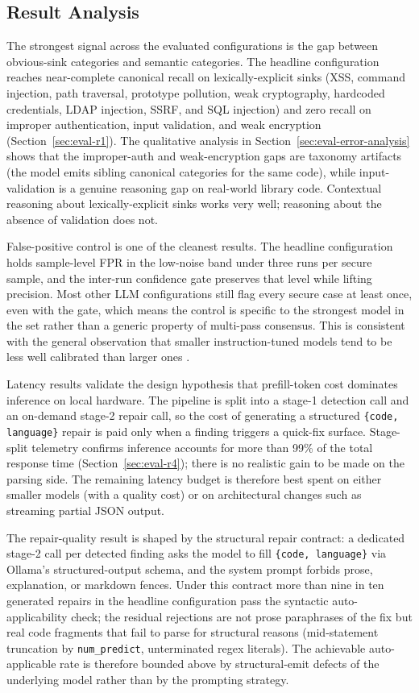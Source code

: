 \subsection{Result Analysis}

The strongest signal across the evaluated configurations is the gap between obvious-sink categories and semantic categories. The headline configuration reaches near-complete canonical recall on lexically-explicit sinks (XSS, command injection, path traversal, prototype pollution, weak cryptography, hardcoded credentials, LDAP injection, SSRF, and SQL injection) and zero recall on improper authentication, input validation, and weak encryption (Section~\ref{sec:eval-r1}). The qualitative analysis in Section~\ref{sec:eval-error-analysis} shows that the improper-auth and weak-encryption gaps are taxonomy artifacts (the model emits sibling canonical categories for the same code), while input-validation is a genuine reasoning gap on real-world library code. Contextual reasoning about lexically-explicit sinks works very well; reasoning about the absence of validation does not.

False-positive control is one of the cleanest results. The headline configuration holds sample-level FPR in the low-noise band under three runs per secure sample, and the inter-run confidence gate preserves that level while lifting precision. Most other LLM configurations still flag every secure case at least once, even with the gate, which means the control is specific to the strongest model in the set rather than a generic property of multi-pass consensus. This is consistent with the general observation that smaller instruction-tuned models tend to be less well calibrated than larger ones \cite{ji2023hallucination}.

Latency results validate the design hypothesis that prefill-token cost dominates inference on local hardware. The pipeline is split into a stage-1 detection call and an on-demand stage-2 repair call, so the cost of generating a structured \texttt{\{code, language\}} repair is paid only when a finding triggers a quick-fix surface. Stage-split telemetry confirms inference accounts for more than 99\% of the total response time (Section~\ref{sec:eval-r4}); there is no realistic gain to be made on the parsing side. The remaining latency budget is therefore best spent on either smaller models (with a quality cost) or on architectural changes such as streaming partial JSON output.

The repair-quality result is shaped by the structural repair contract: a dedicated stage-2 call per detected finding asks the model to fill \texttt{\{code, language\}} via Ollama's structured-output schema, and the system prompt forbids prose, explanation, or markdown fences. Under this contract more than nine in ten generated repairs in the headline configuration pass the syntactic auto-applicability check; the residual rejections are not prose paraphrases of the fix but real code fragments that fail to parse for structural reasons (mid-statement truncation by \texttt{num\_predict}, unterminated regex literals). The achievable auto-applicable rate is therefore bounded above by structural-emit defects of the underlying model rather than by the prompting strategy.

